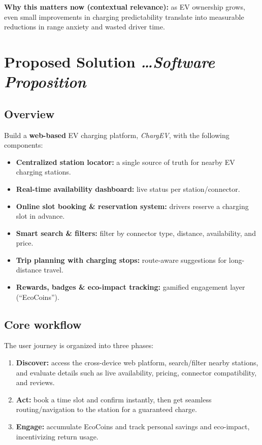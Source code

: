 \documentclass[11pt,a4paper]{article}
\newcommand{\BvrHint}[1]{%
  {\normalfont\normalsize\itshape\hfill #1}}
\begin{document}
\textbf{Why this matters now (contextual relevance):} as EV
ownership grows, even small improvements in charging
predictability translate into measurable reductions in
range anxiety and wasted driver time.

\section{Proposed Solution %
\BvrHint{\ldots Software Proposition}}
\subsection{Overview}
Build a \textbf{web-based} EV charging platform,
\emph{ChargEV}, with the following components:
\begin{itemize}[leftmargin=0.7cm]
    \item \textbf{Centralized station locator:} a single source of truth for nearby EV charging stations.
    \item \textbf{Real-time availability dashboard:} live status per station/connector.
    \item \textbf{Online slot booking \& reservation system:} drivers reserve a charging slot in advance.
    \item \textbf{Smart search \& filters:} filter by connector type, distance, availability, and price.
    \item \textbf{Trip planning with charging stops:} route-aware suggestions for long-distance travel.
    \item \textbf{Rewards, badges \& eco-impact tracking:} gamified engagement layer (``EcoCoins'').
\end{itemize}

\subsection{Core workflow}
The user journey is organized into three phases:
\begin{enumerate}[leftmargin=0.7cm]
    \item \textbf{Discover:} access the cross-device web platform, search/filter nearby stations, and evaluate details such as live availability, pricing, connector compatibility, and reviews.
    \item \textbf{Act:} book a time slot and confirm instantly, then get seamless routing/navigation to the station for a guaranteed charge.
    \item \textbf{Engage:} accumulate EcoCoins and track personal savings and eco-impact, incentivizing return usage.
\end{enumerate}
\end{document}
